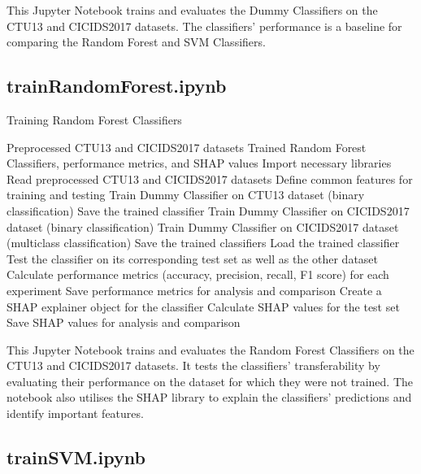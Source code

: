 This Jupyter Notebook trains and evaluates the Dummy Classifiers on the CTU13 and CICIDS2017 datasets. The classifiers' performance is a baseline for comparing the Random Forest and SVM Classifiers.

\subsection{trainRandomForest.ipynb}\label{subsec:trainRandomForest.ipynb}

\begin{algorithm}[H]
\caption{Training Random Forest Classifiers}\label{alg:trainRandomForest}
\begin{algorithmic}[1]
\Require%
Preprocessed CTU13 and CICIDS2017 datasets
\Ensure%
Trained Random Forest Classifiers, performance metrics, and SHAP values
\State%
Import necessary libraries
\State%
Read preprocessed CTU13 and CICIDS2017 datasets
\State%
Define common features for training and testing
        \State%
        Train Dummy Classifier on CTU13 dataset (binary classification)
        \State%
        Save the trained classifier
        \State%
        Train Dummy Classifier on CICIDS2017 dataset (binary classification)
        \State%
        Train Dummy Classifier on CICIDS2017 dataset (multiclass classification)
        \State%
        Save the trained classifiers
    \EndIf%
\EndFor%
    \State%
    Load the trained classifier
    \State%
    Test the classifier on its corresponding test set as well as the other dataset
    \State%
    Calculate performance metrics (accuracy, precision, recall, F1 score) for each experiment
    \State%
    Save performance metrics for analysis and comparison
    \State%
    Create a SHAP explainer object for the classifier
    \State%
    Calculate SHAP values for the test set
    \State%
    Save SHAP values for analysis and comparison
\EndFor%
\end{algorithmic}
\end{algorithm}

This Jupyter Notebook trains and evaluates the Random Forest Classifiers on the CTU13 and CICIDS2017 datasets. It tests the classifiers' transferability by evaluating their performance on the dataset for which they were not trained. The notebook also utilises the SHAP library to explain the classifiers' predictions and identify important features.

\subsection{trainSVM.ipynb}\label{subsec:trainSVM.ipynb}

